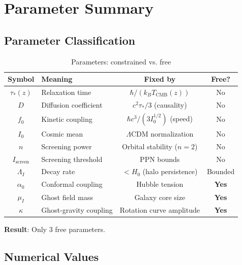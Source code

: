 \documentclass[12pt, a4paper]{article}
\begin{document}

\section{Parameter Summary}

\subsection{Parameter Classification}

\begin{table}[H]
\centering
\caption{Parameters: constrained vs. free}
\label{tab:parameters}
\begin{tabular}{clcc}
\toprule
\textbf{Symbol} & \textbf{Meaning} & \textbf{Fixed by} & \textbf{Free?} \\
\midrule
$\tau_*(z)$ & Relaxation time & $\hbar/(k_B T_{\text{CMB}}(z))$ & No \\
$D$ & Diffusion coefficient & $c^2\tau_*/3$ (causality) & No \\
$f_0$ & Kinetic coupling & $\hbar c^3 / (3 I_0^{1/2})$ (speed) & No \\
$I_0$ & Cosmic mean & $\Lambda$CDM normalization & No \\
$n$ & Screening power & Orbital stability ($n=2$) & No \\
$I_{\text{screen}}$ & Screening threshold & PPN bounds & No \\
$\Lambda_I$ & Decay rate & $< H_0$ (halo persistence) & Bounded \\
\midrule
$\alpha_0$ & Conformal coupling & Hubble tension & \textbf{Yes} \\
$\mu_I$ & Ghost field mass & Galaxy core size & \textbf{Yes} \\
$\kappa$ & Ghost-gravity coupling & Rotation curve amplitude & \textbf{Yes} \\
\bottomrule
\end{tabular}
\end{table}

\textbf{Result}: Only 3 free parameters.

\subsection{Numerical Values}
\end{document}
